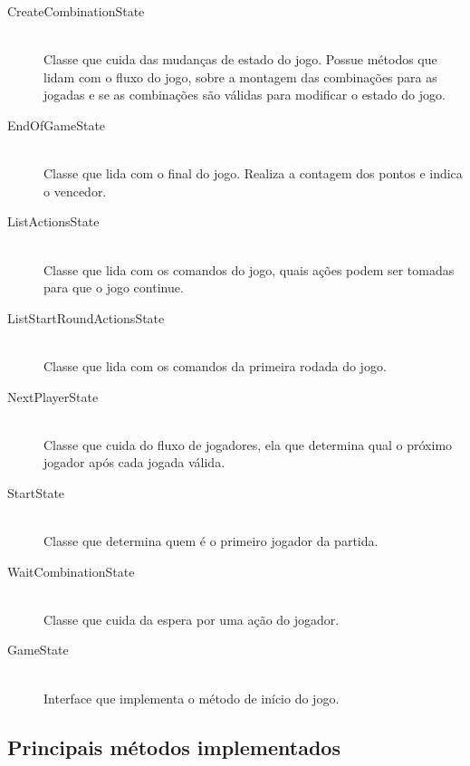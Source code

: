 \documentclass[12pt]{article}
\begin{document}
\begin{description}
\item[CreateCombinationState] \hfill \\
Classe que cuida das mudanças de estado do jogo. Possue métodos que lidam com o fluxo do jogo, sobre a montagem das combinações para as jogadas e se as combinações são válidas para modificar o estado do jogo.
\vspace{0.4 true cm}

\item[EndOfGameState] \hfill \\
Classe que lida com o final do jogo. Realiza a contagem dos pontos e indica o vencedor.
\vspace{0.4 true cm}

\item[ListActionsState] \hfill \\
Classe que lida com os comandos do jogo, quais ações podem ser tomadas para que o jogo continue.
\vspace{0.4 true cm}

\item[ListStartRoundActionsState] \hfill \\
Classe que lida com os comandos da primeira rodada do jogo.
\vspace{0.4 true cm}

\item[NextPlayerState] \hfill \\
Classe que cuida do fluxo de jogadores, ela que determina qual o próximo jogador após cada jogada válida.
\vspace{0.4 true cm}

\item[StartState] \hfill \\
Classe que determina quem é o primeiro jogador da partida.
\vspace{0.4 true cm}

\item[WaitCombinationState] \hfill \\
Classe que cuida da espera por uma ação do jogador.
\vspace{0.4 true cm}

\item[GameState] \hfill \\
Interface que implementa o método de início do jogo.

\end{description}

\subsection{Principais métodos implementados}
\end{document}
